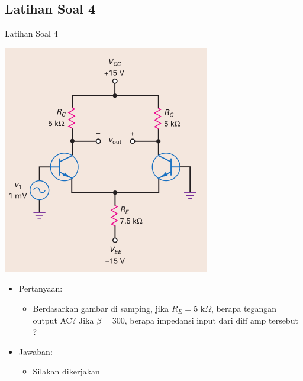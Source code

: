 \documentclass[aspectratio=169]{beamer}
\begin{document}
\subsection{Latihan Soal 4}
\begin{frame}{Latihan Soal 4}
	\begin{multicols}{2}
		\begin{center}
			\includegraphics[height=0.7\textheight]{gambar/01.diff-amp/01.contoh_soal_1-2}
		\end{center}
		\columnbreak
		\begin{itemize}
			\item Pertanyaan:
			\begin{itemize}
				\item Berdasarkan gambar di samping, jika $ R_E = 5 \text{ k}\Omega $, berapa tegangan output AC? Jika $ \beta = 300 $, berapa impedansi input dari diff amp tersebut ?
			\end{itemize}
			\item Jawaban:
			\begin{itemize}
				\item Silakan dikerjakan
			\end{itemize}
		\end{itemize}
	\end{multicols}
\end{frame}
\end{document}
